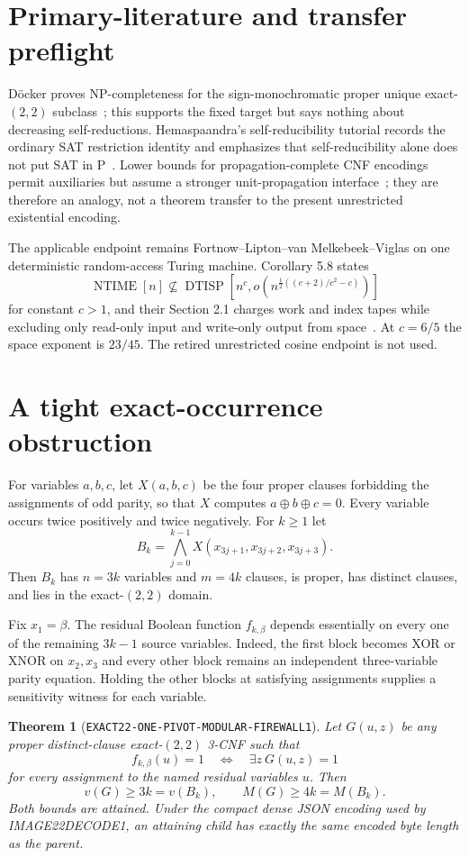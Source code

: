 \documentclass[11pt]{article}
\newtheorem{theorem}{Theorem}
\begin{document}
\section{Primary-literature and transfer preflight}
D\"ocker proves NP-completeness for the sign-monochromatic proper unique
exact-$(2,2)$ subclass~\cite{docker}; this supports the fixed target but says
nothing about decreasing self-reductions.  Hemaspaandra's self-reducibility
tutorial records the ordinary SAT restriction identity and emphasizes that
self-reducibility alone does not put SAT in P~\cite{hem}.  Lower bounds for
propagation-complete CNF encodings permit auxiliaries but assume a stronger
unit-propagation interface~\cite{kucera}; they are therefore an analogy, not
a theorem transfer to the present unrestricted existential encoding.

The applicable endpoint remains Fortnow--Lipton--van Melkebeek--Viglas on
one deterministic random-access Turing machine.  Corollary 5.8 states
\[
 \operatorname{NTIME}[n]\not\subseteq
 \operatorname{DTISP}\!\left[n^c,
 o\!\left(n^{\frac12((c+2)/c^2-c)}\right)\right]            \tag{3}
\]
for constant $c>1$, and their Section 2.1 charges work and index tapes while
excluding only read-only input and write-only output from space~\cite{flmv}.
At $c=6/5$ the space exponent is $23/45$.  The retired unrestricted cosine
endpoint is not used.

\section{A tight exact-occurrence obstruction}
For variables $a,b,c$, let $X(a,b,c)$ be the four proper clauses forbidding
the assignments of odd parity, so that $X$ computes
$a\oplus b\oplus c=0$.  Every variable occurs twice positively and twice
negatively.  For $k\ge1$ let
\[
 B_k=\bigwedge_{j=0}^{k-1}X(x_{3j+1},x_{3j+2},x_{3j+3}).   \tag{4}
\]
Then $B_k$ has $n=3k$ variables and $m=4k$ clauses, is proper, has distinct
clauses, and lies in the exact-$(2,2)$ domain.

Fix $x_1=\beta$.  The residual Boolean function $f_{k,\beta}$ depends
essentially on every one of the remaining $3k-1$ source variables.  Indeed,
the first block becomes XOR or XNOR on $x_2,x_3$ and every other block remains
an independent three-variable parity equation.  Holding the other blocks at
satisfying assignments supplies a sensitivity witness for each variable.

\begin{theorem}[\texttt{EXACT22-ONE-PIVOT-MODULAR-FIREWALL1}]
Let $G(u,z)$ be any proper distinct-clause exact-$(2,2)$ 3-CNF such that
\[
 f_{k,\beta}(u)=1\quad\Longleftrightarrow\quad
 \exists z\ G(u,z)=1                                      \tag{5}
\]
for every assignment to the named residual variables $u$.  Then
\[
 v(G)\ge3k=v(B_k),\qquad M(G)\ge4k=M(B_k).                 \tag{6}
\]
Both bounds are attained.  Under the compact dense JSON encoding used by
IMAGE22DECODE1, an attaining child has exactly the same encoded byte length
as the parent.
\end{theorem}
\end{document}
